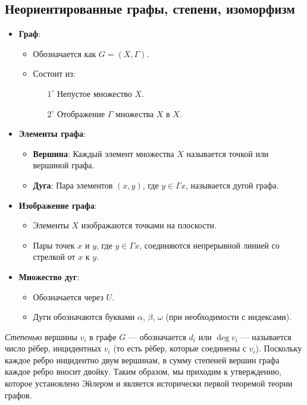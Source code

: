 \subsection{Неориентированные графы, степени, изоморфизм}

\begin{itemize}
	\item \textbf{Граф}:
	\begin{itemize}
		\item Обозначается как $G = (X, \Gamma)$.
		\item Состоит из:
		\begin{enumerate}
			\item[\(1^\circ\)] Непустое множество $X$.
			\item[\(2^\circ\)] Отображение $\Gamma$ множества $X$ в $X$.
		\end{enumerate}
	\end{itemize}

	\item \textbf{Элементы графа}:
	\begin{itemize}
		\item \textbf{Вершина}: Каждый элемент множества $X$ называется точкой или вершиной графа.
		\item \textbf{Дуга}: Пара элементов $(x, y)$, где $y \in \Gamma x$, называется дугой графа.
	\end{itemize}

	\item \textbf{Изображение графа}:
	\begin{itemize}
		\item Элементы $X$ изображаются точками на плоскости.
		\item Пары точек $x$ и $y$, где $y \in \Gamma x$, соединяются непрерывной линией со стрелкой от $x$ к $y$.
	\end{itemize}

	\item \textbf{Множество дуг}:
	\begin{itemize}
		\item Обозначается через $U$.
		\item Дуги обозначаются буквами $\alpha$, $\beta$, $\omega$ (при необходимости с индексами).
	\end{itemize}
\end{itemize}

\textit{Степенью} вершины \(v_i\) в графе \(G\) — обозначается \(d_i\) или \(\deg v_i\) — называется число рёбер, инцидентных \(v_i\) (то есть рёбер, которые соединены с \(v_i\)). Поскольку каждое ребро инцидентно двум вершинам, в сумму степеней вершин графа каждое ребро вносит двойку. Таким образом, мы приходим к утверждению, которое установлено Эйлером и является исторически первой теоремой теории графов.


